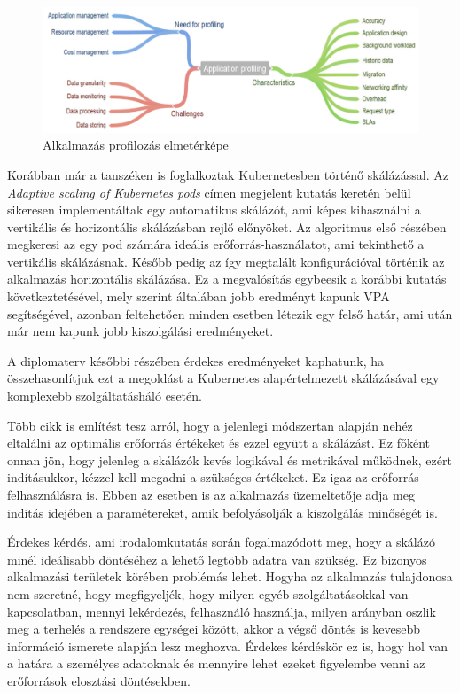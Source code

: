 \begin{figure}[!ht]
\centering
\includegraphics[width=150mm, keepaspectratio]{figures/applicationprofiling.png}
\caption{Alkalmazás profilozás elmetérképe\citep{CloudResourceManagement}}
\label{fig:applicationprofiling}
\end{figure}

Korábban már a tanszéken is foglalkoztak Kubernetesben történő skálázással. Az \emph{Adaptive scaling of Kubernetes pods}\cite{AdaptiveScalingOfPods} címen megjelent kutatás keretén belül sikeresen implementáltak egy automatikus skálázót, ami képes kihasználni a vertikális és horizontális skálázásban rejlő előnyöket. Az algoritmus első részében megkeresi az egy pod számára ideális erőforrás-használatot, ami tekinthető a vertikális skálázásnak. Később pedig az így megtalált konfigurációval történik az alkalmazás horizontális skálázása. Ez a megvalósítás egybeesik a korábbi kutatás következtetésével\citep{bscThesis}, mely szerint általában jobb eredményt kapunk VPA segítségével, azonban feltehetően minden esetben létezik egy felső határ, ami után már nem kapunk jobb kiszolgálási eredményeket. 

A diplomaterv későbbi részében érdekes eredményeket kaphatunk, ha összehasonlítjuk ezt a megoldást a Kubernetes alapértelmezett skálázásával egy komplexebb szolgáltatásháló esetén.

Több cikk\cite{AdaptiveScalingOfPods}\citep{PredictingUsageAndProactiveScaling} is említést tesz
arról, hogy a jelenlegi módszertan alapján nehéz eltalálni az optimális erőforrás értékeket és ezzel
együtt a skálázást. Ez főként onnan jön, hogy jelenleg a skálázók kevés logikával és metrikával
működnek, ezért indításukkor, kézzel kell megadni a szükséges értékeket. Ez igaz az erőforrás
felhasználásra is. Ebben az esetben is az alkalmazás üzemeltetője adja meg indítás idejében a
paramétereket, amik befolyásolják a kiszolgálás minőségét is. 

Érdekes kérdés, ami irodalomkutatás során fogalmazódott meg, hogy a skálázó minél ideálisabb döntéséhez a lehető legtöbb adatra van szükség. Ez bizonyos alkalmazási területek körében problémás lehet. Hogyha az alkalmazás tulajdonosa nem szeretné, hogy megfigyeljék, hogy milyen egyéb szolgáltatásokkal van kapcsolatban, mennyi lekérdezés, felhasználó használja, milyen arányban oszlik meg a terhelés a rendszere egységei között, akkor a végső döntés is kevesebb információ ismerete alapján lesz meghozva.
Érdekes kérdéskör ez is, hogy hol van a határa a személyes adatoknak és mennyire lehet ezeket figyelembe venni az erőforrások elosztási döntésekben.

